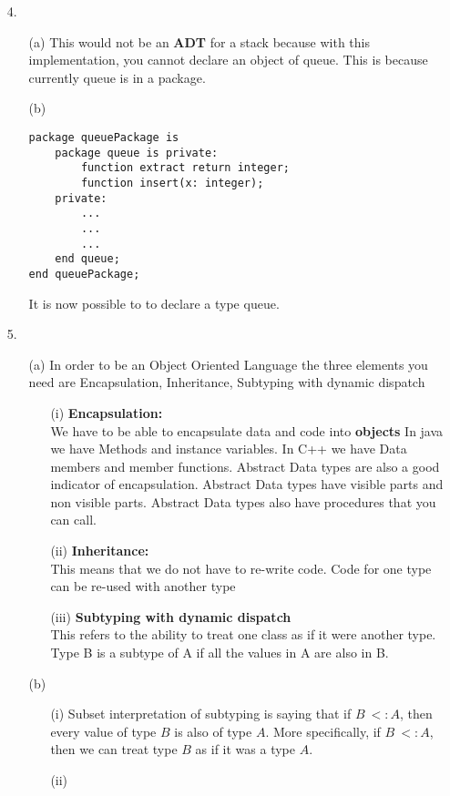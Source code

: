 \documentclass[11pt]{article}
\begin{document}
\begin{enumerate}
\begin{itemize}
\end{itemize}
\newpage
\item[4. ] 
\begin{enumerate}
\item[(a)]  This would not be an \textbf{ADT} for a stack because with this implementation, you cannot declare an object of queue.  This is because currently queue is in a package.
\item[(b)] 
\begin{verbatim}
package queuePackage is
    package queue is private:
        function extract return integer;
        function insert(x: integer);
    private:
        ...
        ...
        ...
    end queue;
end queuePackage;

\end{verbatim}
It is now possible to to declare a type queue.
\end{enumerate}
\newpage
\item[5. ]
\begin{enumerate}
\item[(a)] In order to be 	an Object Oriented Language the three elements you need are Encapsulation, Inheritance, Subtyping with dynamic dispatch
\begin{enumerate}
\item[(i)] \textbf{Encapsulation: }\\
We have to be able to encapsulate data and code into \textbf{objects}
In java we have Methods and instance variables.  In C++ we have Data members and member functions.  Abstract Data types are also a good indicator of encapsulation.  Abstract Data types have visible parts and non visible parts.  Abstract Data types also have procedures that you can call.\\ 
\item[(ii)] \textbf{Inheritance: }\\
This means that we do not have to re-write code.  Code for one type can be re-used with another type\\
\item[(iii)] \textbf{Subtyping with dynamic dispatch} \\
This refers to the ability to treat one class as if it were another type.  Type B is a subtype of A if all the values in A are also in B. \\
\end{enumerate}
\item[(b)]
\begin{enumerate}
\item[(i)] Subset interpretation of subtyping is saying that if $B\ <: A$, then every value of type $B$ is also of type $A$.  More specifically, if $B\ <: A$, then we can treat type $B$ as if it was a type $A$.\\
\item[(ii)]
\end{enumerate}
\end{enumerate}
\end{enumerate}
\end{document}
